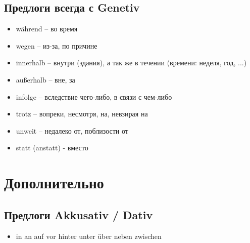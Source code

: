 \subsection{Предлоги всегда с Genetiv}

\begin{itemize}
\item während -- во время
\item wegen -- из-за, по причине
\item innerhalb -- внутри (здания), а так же в течении (времени: неделя, год, ...)
\item außerhalb -- вне, за
\item infolge -- вследствие чего-либо, в связи с чем-либо
\item trotz -- вопреки, несмотря, на, невзирая на
\item unweit -- недалеко от, поблизости от
\item statt (anstatt) - вместо
\end{itemize}

\section{Дополнительно}

\subsection{Предлоги Akkusativ / Dativ}
\begin{itemize}
\item in an auf vor hinter unter über neben zwischen
\end{itemize}


